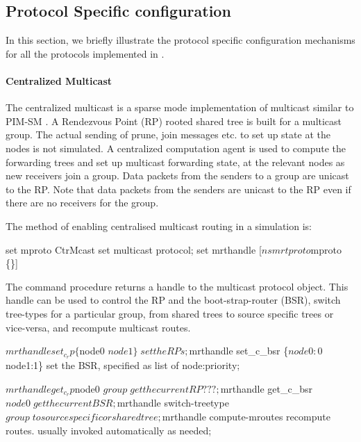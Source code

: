 \subsection{Protocol Specific configuration}

In this section, we briefly illustrate the
protocol specific configuration mechanisms
for all the protocols implemented in \ns.

\paragraph{Centralized Multicast}
The centralized multicast is a sparse mode implementation of multicast
similar to PIM-SM \cite{Deer94a:Architecture}.
A Rendezvous Point (RP) rooted shared tree is built
for a multicast group.  The actual sending of prune, join messages
etc. to set up state at the nodes is not simulated.  A centralized
computation agent is used to compute the forwarding trees and set up
multicast forwarding state,  at the relevant nodes as new
receivers join a group.  Data packets from the senders to a group are
unicast to the RP.  Note that data packets from the senders are
unicast to the RP even if there are no receivers for the group.

The method of enabling centralised multicast routing in a simulation is:
\begin{program}
        set mproto CtrMcast    \; set multicast protocol;
        set mrthandle [$ns mrtproto $mproto \{\}]
\end{program}
The command procedure 
returns a handle to the multicast protocol object.
This handle can be used to control the RP and the boot-strap-router (BSR),
switch tree-types for a particular group,
from shared trees to source specific trees or vice-versa, and
recompute multicast routes.
\begin{program}
        $mrthandle set_c_rp \{$node0 $node1\}      \; set the RPs;
        $mrthandle set_c_bsr \{$node0:0 $node1:1\} \; set the BSR, specified as list of node:priority;

        $mrthandle get_c_rp $node0 $group          \; get the current RP ???;
        $mrthandle get_c_bsr $node0                \; get the current BSR;

        $mrthandle switch-treetype $group         \; to source specific or shared tree;

        $mrthandle compute-mroutes       \; recompute routes. usually invoked automatically as needed;
\end{program}

